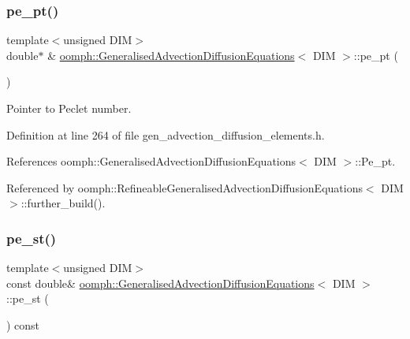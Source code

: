 \mbox{\label{classoomph_1_1GeneralisedAdvectionDiffusionEquations_a50b5c90517d71102ffe743f126993081}} 
\subsubsection{\texorpdfstring{pe\+\_\+pt()}{pe\_pt()}}
{\footnotesize\ttfamily template$<$unsigned D\+IM$>$ \\
double$\ast$ \& \hyperlink{classoomph_1_1GeneralisedAdvectionDiffusionEquations}{oomph\+::\+Generalised\+Advection\+Diffusion\+Equations}$<$ D\+IM $>$\+::pe\+\_\+pt (\begin{DoxyParamCaption}{ }\end{DoxyParamCaption})\hspace{0.3cm}{\ttfamily [inline]}}



Pointer to Peclet number. 



Definition at line 264 of file gen\+\_\+advection\+\_\+diffusion\+\_\+elements.\+h.



References oomph\+::\+Generalised\+Advection\+Diffusion\+Equations$<$ D\+I\+M $>$\+::\+Pe\+\_\+pt.



Referenced by oomph\+::\+Refineable\+Generalised\+Advection\+Diffusion\+Equations$<$ D\+I\+M $>$\+::further\+\_\+build().

\mbox{\label{classoomph_1_1GeneralisedAdvectionDiffusionEquations_a9ba19e458e9afa3774437709951aada9}} 
\subsubsection{\texorpdfstring{pe\+\_\+st()}{pe\_st()}}
{\footnotesize\ttfamily template$<$unsigned D\+IM$>$ \\
const double\& \hyperlink{classoomph_1_1GeneralisedAdvectionDiffusionEquations}{oomph\+::\+Generalised\+Advection\+Diffusion\+Equations}$<$ D\+IM $>$\+::pe\+\_\+st (\begin{DoxyParamCaption}{ }\end{DoxyParamCaption}) const\hspace{0.3cm}{\ttfamily [inline]}}



